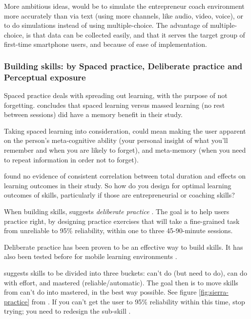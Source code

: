   More ambitious ideas, would be to simulate the entrepreneur coach environment more accurately than via text (using more channels, like audio, video, voice), or to do simulations instead of using multiple-choice. The advantage of multiple-choice, is that data can be collected easily, and that it serves the target group of first-time smartphone users, and because of ease of implementation.

  \subsubsection{Building skills: by Spaced practice, Deliberate practice and Perceptual exposure}

  Spaced practice deals with spreading out learning, with the purpose of not forgetting. \cite{gates} concludes that spaced learning versus massed learning (no rest between sessions) did have a memory benefit in their study.

  Taking spaced learning into consideration, could mean making the user apparent on the person's meta-cognitive ability (your personal insight of what you'll remember and when you are likely to forget), and meta-memory (when you need to repeat information in order not to forget).

  \cite{gates} found no evidence of consistent correlation between total duration and effects on learning outcomes in their study. So how do you design for optimal learning outcomes of skills, particularly if those are entrepreneurial or coaching skills?

  When building skills, \cite{sierra} suggests \textit{deliberate practice} \citep{yengin}. The goal is to help users practice right, by designing practice exercises that will take a fine-grained task from unreliable to 95\% reliability, within one to three 45-90-minute sessions.

  Deliberate practice has been proven to be an effective way to build skills. It has also been tested before for mobile learning environments \citep{yengin}.

  \cite{sierra} suggests skills to be divided into three buckets: can't do (but need to do), can do with effort, and mastered (reliable/automatic). The goal then is to move skills from can't do into mastered, in the best way possible. See figure \ref{fig:sierra-practice} from \cite{sierra}. If you can’t get the user to 95\% reliability within this time, stop trying; you need to redesign the sub-skill \citep{sierra}.

